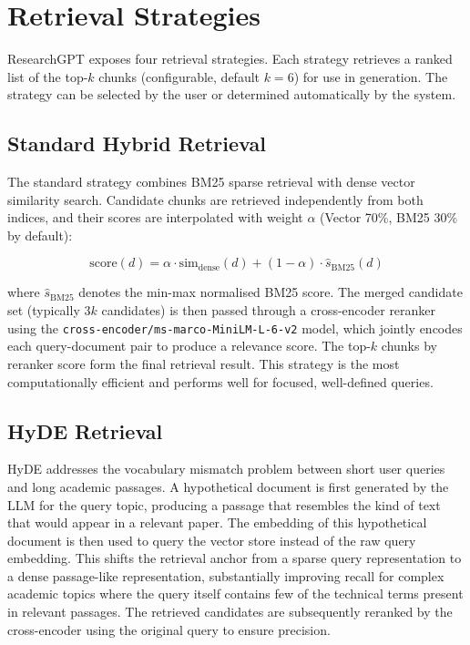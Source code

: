 \documentclass[12pt, a4paper]{article}
\begin{document}
\section{Retrieval Strategies}

ResearchGPT exposes four retrieval strategies. Each strategy retrieves a ranked
list of the top-$k$ chunks (configurable, default $k = 6$) for use in generation.
The strategy can be selected by the user or determined automatically by the system.

\subsection{Standard Hybrid Retrieval}

The standard strategy combines BM25 sparse retrieval with dense vector similarity
search. Candidate chunks are retrieved independently from both indices, and their
scores are interpolated with weight $\alpha$ (Vector 70\%, BM25 30\% by default):

\begin{equation}
  \text{score}(d) = \alpha \cdot \text{sim}_{\text{dense}}(d)
                  + (1 - \alpha) \cdot \hat{s}_{\text{BM25}}(d)
  \label{eq:hybrid}
\end{equation}

where $\hat{s}_{\text{BM25}}$ denotes the min-max normalised BM25 score. The
merged candidate set (typically $3k$ candidates) is then passed through a
cross-encoder reranker \cite{nogueira2019} using the
\texttt{cross-encoder/ms-marco-MiniLM-L-6-v2} model, which jointly encodes each
query-document pair to produce a relevance score. The top-$k$ chunks by reranker
score form the final retrieval result. This strategy is the most computationally
efficient and performs well for focused, well-defined queries.

\subsection{HyDE Retrieval}

HyDE \cite{gao2022} addresses the vocabulary mismatch problem between short user
queries and long academic passages. A hypothetical document is first generated by
the LLM for the query topic, producing a passage that resembles the kind of text
that would appear in a relevant paper. The embedding of this hypothetical document
is then used to query the vector store instead of the raw query embedding. This
shifts the retrieval anchor from a sparse query representation to a dense
passage-like representation, substantially improving recall for complex academic
topics where the query itself contains few of the technical terms present in
relevant passages. The retrieved candidates are subsequently reranked by the
cross-encoder using the original query to ensure precision.
\end{document}

